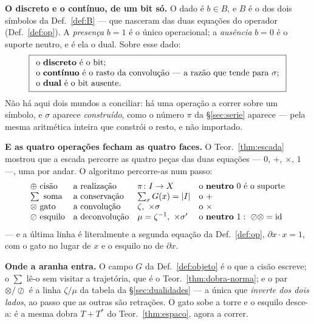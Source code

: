 \documentclass[11pt,a4paper]{article}
\newcommand{\abs}[1]{\lvert #1\rvert}
\begin{document}
\medskip\noindent\textbf{O discreto e o contínuo, de um bit só.} O dado é
$b\in B$, e $B$ é o dos dois símbolos da Def.~\ref{def:B} --- que nasceram das
duas equações do operador (Def.~\ref{def:op}). A \emph{presença} $b=1$ é o único
operacional; a \emph{ausência} $b=0$ é o suporte neutro, e é ela o dual. Sobre
esse dado:
\[
\boxed{
\begin{array}{l}
\text{o \textbf{discreto} é o bit;}\\
\text{o \textbf{contínuo} é o rasto da convolução --- a razão que tende para }\sigma;\\
\text{o \textbf{dual} é o bit ausente.}
\end{array}}
\]
Não há aqui dois mundos a conciliar: há uma operação a correr sobre um símbolo,
e $\sigma$ aparece \emph{construído}, como o número $\pi$ da §\ref{sec:serie}
aparece --- pela mesma aritmética inteira que constrói o resto, e não importado.

\medskip\noindent\textbf{E as quatro operações fecham as quatro faces.} O
Teor.~\ref{thm:escada} mostrou que a escada percorre as quatro peças das duas
equações --- $0$, $+$, $\times$, $1$ ---, uma por andar. O algoritmo percorre-as
num passo:
\[
\begin{array}{llll}
\oplus\ \text{cisão} & \text{a realização} & \pi\colon I\to X & \text{o \textbf{neutro} }0\ \text{é o suporte}\\
\sum\ \text{soma} & \text{a conservação} & \sum_x G(x)=\abs{I} & \text{o \textbf{}}+\\
\otimes\ \text{gato} & \text{a convolução} & \zeta,\ \times\sigma & \text{o \textbf{}}\times\\
\oslash\ \text{esquilo} & \text{a deconvolução} & \mu=\zeta^{-1},\ \times\sigma' & \text{o \textbf{neutro} }1:\ \oslash\otimes=\mathrm{id}
\end{array}
\]
--- e a última linha é literalmente a segunda equação da Def.~\ref{def:op},
$\partial x\cdot x=1$, com o gato no lugar de $x$ e o esquilo no de $\partial x$.

\medskip\noindent\textbf{Onde a aranha entra.} O campo $G$ da
Def.~\ref{def:objeto} é o que a cisão escreve; o $\sum$ lê-o sem visitar a
trajetória, que é o Teor.~\ref{thm:dobra-norma}; e o par $\otimes/\oslash$ é a
linha $\zeta/\mu$ da tabela da §\ref{sec:dualidades} --- a única que
\emph{inverte dos dois lados}, ao passo que as outras são retrações. O gato sobe
a torre e o esquilo desce-a: é a mesma dobra $T+T^{*}$ do Teor.~\ref{thm:espaco},
agora a correr.

\end{document}
